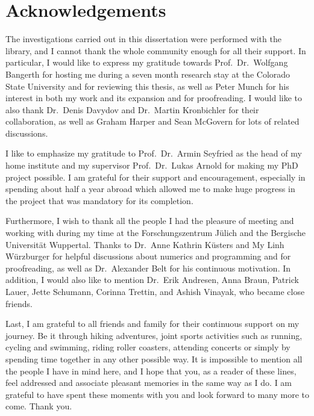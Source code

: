 \section*{Acknowledgements}

The investigations carried out in this dissertation were performed with the \dealii{} library, and I cannot thank the whole \dealii{} community enough for all their support. In particular, I would like to express my gratitude towards Prof.\ Dr.\ Wolfgang Bangerth for hosting me during a seven month research stay at the Colorado State University and for reviewing this thesis, as well as Peter Munch for his interest in both my work and its expansion and for proofreading. I would like to also thank Dr.\ Denis Davydov and Dr.\ Martin Kronbichler for their collaboration, as well as Graham Harper and Sean McGovern for lots of \dealii{} related discussions.

I like to emphasize my gratitude to Prof.\ Dr.\ Armin Seyfried as the head of my home institute and my supervisor Prof.\ Dr.\ Lukas Arnold for making my PhD project possible. I am grateful for their support and encouragement, especially in spending about half a year abroad which allowed me to make huge progress in the project that was mandatory for its completion.

Furthermore, I wish to thank all the people I had the pleasure of meeting and working with during my time at the Forschungszentrum Jülich and the Bergische Universität Wuppertal. Thanks to Dr.\ Anne Kathrin Küsters and My Linh Würzburger for helpful discussions about numerics and programming and for proofreading, as well as Dr.\ Alexander Belt for his continuous motivation. In addition, I would also like to mention Dr.\ Erik Andresen, Anna Braun, Patrick Lauer, Jette Schumann, Corinna Trettin, and Ashish Vinayak, who became close friends.

Last, I am grateful to all friends and family for their continuous support on my journey. Be it through hiking adventures, joint sports activities such as running, cycling and swimming, riding roller coasters, attending concerts or simply by spending time together in any other possible way. It is impossible to mention all the people I have in mind here, and I hope that you, as a reader of these lines, feel addressed and associate pleasant memories in the same way as I do. I am grateful to have spent these moments with you and look forward to many more to come. Thank you.
